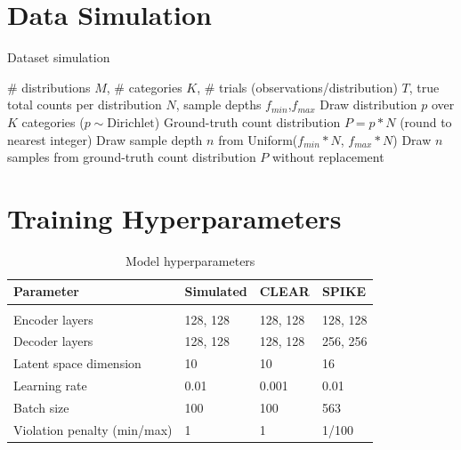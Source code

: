 \documentclass{article}
\theoremstyle{plain}
\theoremstyle{definition}
\theoremstyle{remark}
\begin{document}




\newpage
\appendix
\onecolumn

\section{Data Simulation}
\label{appendix:simulation}

\begin{algorithm*}[h]
   \caption{Dataset simulation}
   \label{alg:example}
\begin{algorithmic}
    \# distributions $M$, \# categories $K$, \# trials (observations/distribution) $T$, true total counts per distribution $N$, sample depths $f_{min}$,$f_{max}$
   \STATE Draw distribution $p$ over $K$ categories ($p \sim \text{Dirichlet}$)
   \STATE Ground-truth count distribution $P = p*N$ (round to nearest integer)
   \STATE Draw sample depth $n$ from Uniform($f_{min} * N$, $f_{max} * N$)
   \STATE Draw $n$ samples from ground-truth count distribution $P$ without replacement
   \ENDFOR
   \ENDFOR
\end{algorithmic}
\end{algorithm*}

\section{Training Hyperparameters}
\label{appendix:hyperparams}

\begin{table}[h]
\centering
\caption{Model hyperparameters}
\label{sample-table}
\begin{tabular}{l|lll}
\bf Parameter & \bf Simulated & \bf CLEAR & \bf SPIKE
\\ \hline \\
Encoder layers & 128, 128 & 128, 128 & 128, 128 \\
Decoder layers & 128, 128 & 128, 128 & 256, 256 \\
Latent space dimension & 10 & 10 & 16 \\
Learning rate & 0.01 & 0.001 & 0.01 \\
Batch size & 100 & 100 & 563 \\
Violation penalty (min/max) & 1 & 1 & 1/100 \\

\end{tabular}
\end{table}
\end{document}
